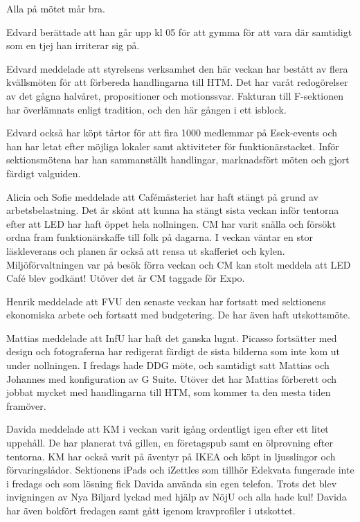 \documentclass[10pt]{article}
\begin{document}
\begin{paragrafer}
\begin{paragrafer}
Alla på mötet mår bra. 

Edvard berättade att han går upp kl 05 för att gymma för att vara där samtidigt som en tjej han irriterar sig på.

Edvard meddelade att styrelsens verksamhet den här veckan har bestått av flera kvällsmöten för att förbereda handlingarna till HTM. Det har varåt redogörelser av det gågna halvåret, propositioner och motionssvar. 
Fakturan till F-sektionen har överlämnats enligt tradition, och den här gången i ett isblock. 

Edvard också har köpt tårtor för att fira 1000 medlemmar på Esek-events och han har letat efter möjliga lokaler samt aktiviteter för funktionärstacket. Inför sektionsmötena har han sammanställt handlingar, marknadsfört möten och gjort färdigt valguiden. 

Alicia och Sofie meddelade att Cafémästeriet har haft stängt på grund av arbetsbelastning. Det är skönt att kunna ha stängt sista veckan inför tentorna efter att LED har haft öppet hela nollningen. CM har varit snälla och försökt ordna fram funktionärskaffe till folk på dagarna. I veckan väntar en stor läskleverans och planen är också att rensa ut skafferiet och kylen. 
Miljöförvaltningen var på besök förra veckan och CM kan stolt meddela att LED Café blev godkänt! Utöver det är CM taggade för Expo. 

Henrik meddelade att FVU den senaste veckan har fortsatt med sektionens ekonomiska arbete och fortsatt med budgetering. De har även haft utskottsmöte.

Mattias meddelade att InfU har haft det ganska lugnt. Picasso fortsätter med design och fotograferna har redigerat färdigt de sista bilderna som inte kom ut under nollningen. I fredags hade DDG möte, och samtidigt satt Mattias och Johannes med konfiguration av G Suite. 
Utöver det har Mattias förberett och jobbat mycket med handlingarna till HTM, som kommer ta den mesta tiden framöver. 

Davida meddelade att KM i veckan varit igång ordentligt igen efter ett litet uppehåll. De har planerat två gillen, en företagspub samt en ölprovning efter tentorna. KM har också varit på äventyr på IKEA och köpt in ljusslingor och förvaringslådor. Sektionens iPads och iZettles som tillhör Edekvata fungerade inte i fredags och som lösning fick Davida använda sin egen telefon. Trots det blev invigningen av Nya Biljard lyckad med hjälp av NöjU och alla hade kul! Davida har även bokfört fredagen samt gått igenom kravprofiler i utskottet. 


\end{paragrafer}
\end{paragrafer}
\end{document}
